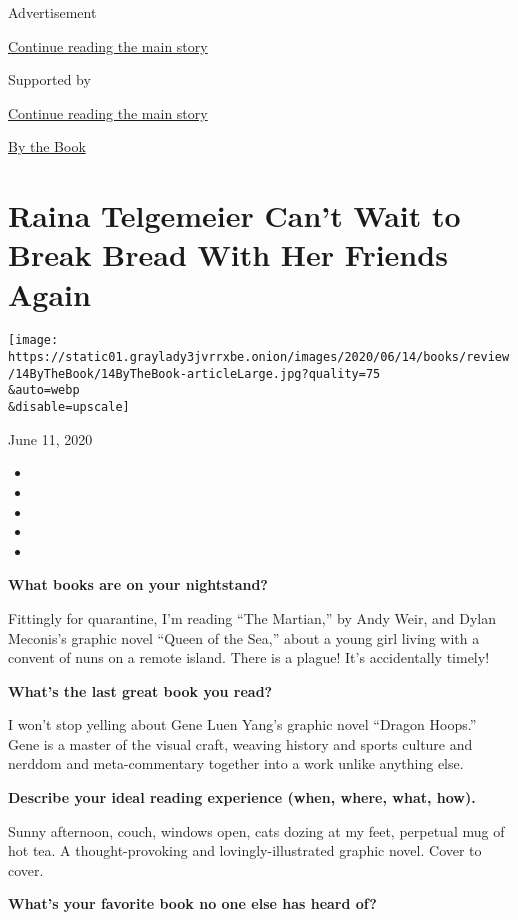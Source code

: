 Advertisement

\protect\hyperlink{after-top}{Continue reading the main story}

Supported by

\protect\hyperlink{after-sponsor}{Continue reading the main story}

\href{/column/by-the-book}{By the Book}

\hypertarget{raina-telgemeier-cant-wait-to-break-bread-with-her-friends-again}{%
\section{Raina Telgemeier Can't Wait to Break Bread With Her Friends
Again}\label{raina-telgemeier-cant-wait-to-break-bread-with-her-friends-again}}

\texttt{[image: https://static01.graylady3jvrrxbe.onion/images/2020/06/14/books/review/14ByTheBook/14ByTheBook-articleLarge.jpg?quality=75\\\&auto=webp\\\&disable=upscale]}

June 11, 2020

\begin{itemize}
\item
\item
\item
\item
\item
\end{itemize}

\textbf{What books are on your nightstand?}

Fittingly for quarantine, I'm reading ``The Martian,'' by Andy Weir, and
Dylan Meconis's graphic novel ``Queen of the Sea,'' about a young girl
living with a convent of nuns on a remote island. There is a plague!
It's accidentally timely!

\textbf{What's the last great book you read?}

I won't stop yelling about Gene Luen Yang's graphic novel ``Dragon
Hoops.'' Gene is a master of the visual craft, weaving history and
sports culture and nerddom and meta-commentary together into a work
unlike anything else.

\textbf{Describe your ideal reading experience (when, where, what,
how).}

Sunny afternoon, couch, windows open, cats dozing at my feet, perpetual
mug of hot tea. A thought-provoking and lovingly-illustrated graphic
novel. Cover to cover.

\textbf{What's your favorite book no one else has heard of?}


